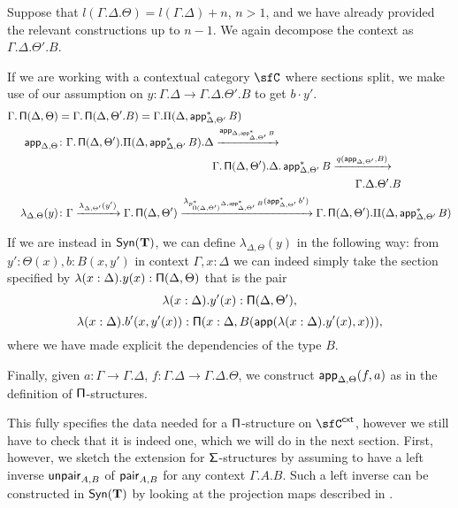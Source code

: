 \begin{construction}[Part 2]
  Suppose that
  $l(\Gamma.\Delta.\Theta)=l(\Gamma.\Delta)+n$, $n>1$, and we have already
  provided the relevant constructions up to $n-1$. We again decompose
  the context as $\Gamma.\Delta.\Theta'.B$.

  If we are working with a contextual category $\sfC$ where sections split, we
  make use of our assumption on
  $y\colon\Gamma.\Delta\rightarrow\Gamma.\Delta.\Theta'.B$ to get $b\cdot y'$.
  \begin{align*}
    \Gamma.\operatorname{\mathsf{\Pi}}(\Delta,\Theta)
    &=\Gamma.\operatorname{\mathsf{\Pi}}(\Delta,\Theta'.B)=\Gamma.\Pi(\Delta,\operatorname{\mathsf{app}}^*_{\Delta,\Theta'}B) \\
    \operatorname{\mathsf{app}}_{\Delta,\Theta}
    &\colon\Gamma.\operatorname{\mathsf{\Pi}}(\Delta,\Theta').\Pi(\Delta,\operatorname{\mathsf{app}}^*_{\Delta,\Theta'}B).\Delta
    \xrightarrow{\operatorname{\mathsf{app}}_{\Delta,\operatorname{\mathsf{app}}^*_{\Delta,\Theta'}B}} \\
    &\quad\quad\quad\quad\quad\quad\quad\quad\quad\quad\quad\quad\quad\quad
    \Gamma.\operatorname{\mathsf{\Pi}}(\Delta,\Theta').\Delta.\operatorname{\mathsf{app}}^*_{\Delta,\Theta'}B
    \xrightarrow{q(\operatorname{\mathsf{app}}_{\Delta,\Theta'},B)} \\
    &\quad\quad\quad\quad\quad\quad\quad\quad\quad\quad\quad\quad\quad\quad\quad\quad\quad\quad\quad\quad\quad\quad\quad\quad\quad\quad\quad
    \Gamma.\Delta.\Theta'.B \\
    \lambda_{\Delta,\Theta}(y)
    &\colon\Gamma
    \xrightarrow{\lambda_{\Delta,\Theta'}(y')}
    \Gamma.\operatorname{\mathsf{\Pi}}(\Delta,\Theta')
    \xrightarrow{\lambda_{p^*_{\operatorname{\mathsf{\Pi}}(\Delta,\Theta')}\Delta,\operatorname{\mathsf{app}}^*_{\Delta,\Theta'}B}(\operatorname{\mathsf{app}}_{\Delta,\Theta'}^*b')}
    \Gamma.\operatorname{\mathsf{\Pi}}(\Delta,\Theta').\Pi(\Delta,\operatorname{\mathsf{app}}^*_{\Delta,\Theta'}B)
  \end{align*}

  If we are instead in $\mathsf{Syn}(\mathbf{T})$, we can define $\lambda_{\Delta,\Theta}(y)$ in
  the following way: from $y':\Theta(x),b:B(x,y')$ in context $\Gamma,x:\Delta$
  we can indeed simply take the section specified
  by $\lambda(x:\Delta).y(x):\operatorname{\mathsf{\Pi}}(\Delta,\Theta)$ that is the pair
  \[\lambda(x:\Delta).y'(x):\operatorname{\mathsf{\Pi}}(\Delta,\Theta'),\]
  \[\lambda(x:\Delta).b'(x,y'(x)):\operatorname{\mathsf{\Pi}}(x:\Delta,B(\operatorname{\mathsf{app}}(\lambda(x:\Delta).y'(x),x))),\]
  where we have made explicit the dependencies of the type $B$.

Finally, given $a\colon\Gamma\rightarrow\Gamma.\Delta$,
$f\colon\Gamma.\Delta\rightarrow\Gamma.\Delta.\Theta$, we construct
$\operatorname{\mathsf{app}}_{\Delta,\Theta}(f,a)$ as in the definition of $\operatorname{\mathsf{\Pi}}$-structures.
\end{construction}


This fully specifies the data needed for a $\operatorname{\mathsf{\Pi}}$-structure on $\sfC^{\cxt}$,
however we still have to check that it is indeed one, which we will do in the
next section. First, however, we sketch the extension for $\operatorname{\mathsf{\Sigma}}$-structures
by assuming to have a left inverse $\operatorname{\mathsf{unpair}}_{A,B}$
of $\operatorname{\mathsf{pair}}_{A,B}$ for any context $\Gamma.A.B$. Such a left inverse can be
constructed in $\mathsf{Syn}(\mathbf{T})$ by looking at the projection maps described in
\cite[Sec.\ 1.6]{Uni13}.

